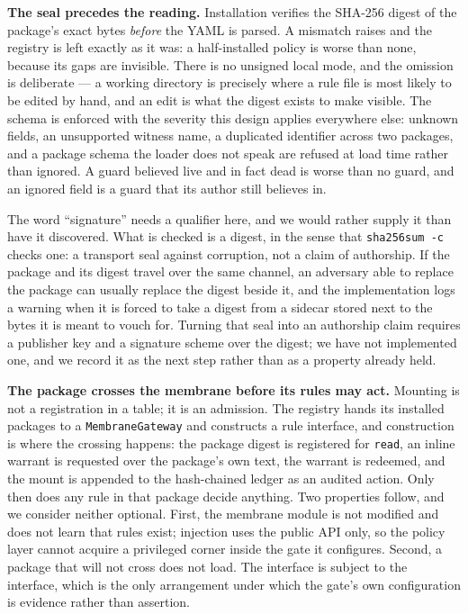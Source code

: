\documentclass[conference]{IEEEtran}
\begin{document}
\textbf{The seal precedes the reading.}
Installation verifies the SHA-256 digest of the package's exact bytes
\emph{before} the YAML is parsed. A mismatch raises and the registry is left
exactly as it was: a half-installed policy is worse than none, because its gaps
are invisible. There is no unsigned local mode, and the omission is deliberate
--- a working directory is precisely where a rule file is most likely to be
edited by hand, and an edit is what the digest exists to make visible. The schema
is enforced with the severity this design applies everywhere else: unknown
fields, an unsupported witness name, a duplicated identifier across two
packages, and a package schema the loader does not speak are refused at load time
rather than ignored. A guard believed live and in fact dead is worse than no
guard, and an ignored field is a guard that its author still believes in.

The word ``signature'' needs a qualifier here, and we would rather supply it than
have it discovered. What is checked is a digest, in the sense that
\texttt{sha256sum -c} checks one: a transport seal against corruption, not a
claim of authorship. If the package and its digest travel over the same channel,
an adversary able to replace the package can usually replace the digest beside
it, and the implementation logs a warning when it is forced to take a digest from
a sidecar stored next to the bytes it is meant to vouch for. Turning that seal
into an authorship claim requires a publisher key and a signature scheme over the
digest; we have not implemented one, and we record it as the next step rather
than as a property already held.

\textbf{The package crosses the membrane before its rules may act.}
Mounting is not a registration in a table; it is an admission. The registry hands
its installed packages to a \texttt{MembraneGateway} and constructs a rule
interface, and construction is where the crossing happens: the package digest is
registered for \texttt{read}, an inline warrant is requested over the package's
own text, the warrant is redeemed, and the mount is appended to the hash-chained
ledger as an audited action. Only then does any rule in that package decide
anything. Two properties follow, and we consider neither optional. First, the
membrane module is not modified and does not learn that rules exist; injection
uses the public API only, so the policy layer cannot acquire a privileged corner
inside the gate it configures. Second, a package that will not cross does not
load. The interface is subject to the interface, which is the only arrangement
under which the gate's own configuration is evidence rather than assertion.
\end{document}
